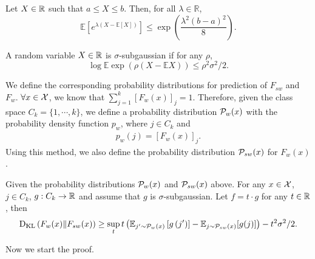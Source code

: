 \begin{lemma} \label{hoeffding_lemma}
Let $X \in \mathbb{R}$ such that $a \leq X \leq b$. Then, for all $\lambda \in \mathbb{R}$,
$$\mathbb{E}\left[e^{\lambda(X-\mathbb{E}[X])}\right] \leq \exp \left(\frac{\lambda^2(b-a)^2}{8}\right).$$
\end{lemma}

\begin{definition}
A random variable $X \in \mathbb{R}$ is $\sigma$-subgaussian if for any $\rho$, 
$$\log \mathbb{E} \exp (\rho(X-\mathbb{E} X)) \leq \rho^2 \sigma^2 / 2.$$
\end{definition}


We define the corresponding probability distributions for prediction of $F_{sw}$ and $F_w$.
$\forall x \in \mathcal{X}$, we know that $\sum_{j=1}^k [F_w(x)]_j = 1$. Therefore, given the class space $C_k = \{ 1, \cdots, k \}$, we define a probability distribution $\mathcal{P}_{w}(x)$ with the probability density function $p_w$, where $j \in C_k$ and 
\begin{align} \label{def_new_distribution}
    p_w(j)=[F_w(x)]_j.
\end{align}
Using this method, we also define the probability distribution $\mathcal{P}_{sw}(x)$ for $F_{w}(x)$.


\begin{lemma} \label{infor_lemma}
Given the probability distributions $\mathcal{P}_{w}(x)$ and $\mathcal{P}_{sw}(x)$ above.
For any $x \in \mathcal{X}$, $j \in C_k$, $g: C_k \to \mathbb{R}$ and assume that $g$ is $\sigma$-subgaussian.
Let $f=t \cdot g$ for any $t \in \mathbb{R}$, then 
$$\mathrm{D}_{\mathrm{KL}}\left( F_w(x) \| F_{sw}(x) \right) \ge \sup _t t\left(\mathbb{E}_{j^{\prime} \sim \mathcal{P}_w(x)}\left[g\left(j^{\prime}\right)\right]-\mathbb{E}_{j \sim \mathcal{P}_{sw}(x)}[g(j)]\right)-t^2 \sigma^2 / 2.$$
\end{lemma}




Now we start the proof.

